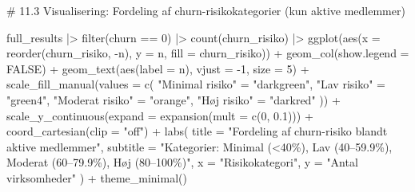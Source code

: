 \documentclass[
  11pt,
  letterpaper,
  DIV=11,
  numbers=noendperiod]{scrartcl}
\newenvironment{Shaded}{\begin{snugshade}}{\end{snugshade}}
\newcommand{\AttributeTok}[1]{\textcolor[rgb]{0.40,0.45,0.13}{#1}}
\newcommand{\CommentTok}[1]{\textcolor[rgb]{0.37,0.37,0.37}{#1}}
\newcommand{\ConstantTok}[1]{\textcolor[rgb]{0.56,0.35,0.01}{#1}}
\newcommand{\DecValTok}[1]{\textcolor[rgb]{0.68,0.00,0.00}{#1}}
\newcommand{\FloatTok}[1]{\textcolor[rgb]{0.68,0.00,0.00}{#1}}
\newcommand{\FunctionTok}[1]{\textcolor[rgb]{0.28,0.35,0.67}{#1}}
\newcommand{\NormalTok}[1]{\textcolor[rgb]{0.00,0.23,0.31}{#1}}
\newcommand{\OtherTok}[1]{\textcolor[rgb]{0.00,0.23,0.31}{#1}}
\newcommand{\SpecialCharTok}[1]{\textcolor[rgb]{0.37,0.37,0.37}{#1}}
\newcommand{\StringTok}[1]{\textcolor[rgb]{0.13,0.47,0.30}{#1}}
\begin{document}
\begin{Shaded}
\begin{Highlighting}[]
\CommentTok{\# 11.3 Visualisering: Fordeling af churn{-}risikokategorier (kun aktive medlemmer)}


\NormalTok{full\_results }\SpecialCharTok{|\textgreater{}} 
  \FunctionTok{filter}\NormalTok{(churn }\SpecialCharTok{==} \DecValTok{0}\NormalTok{) }\SpecialCharTok{|\textgreater{}}  
  \FunctionTok{count}\NormalTok{(churn\_risiko) }\SpecialCharTok{|\textgreater{}} 
  \FunctionTok{ggplot}\NormalTok{(}\FunctionTok{aes}\NormalTok{(}\AttributeTok{x =} \FunctionTok{reorder}\NormalTok{(churn\_risiko, }\SpecialCharTok{{-}}\NormalTok{n), }\AttributeTok{y =}\NormalTok{ n, }\AttributeTok{fill =}\NormalTok{ churn\_risiko)) }\SpecialCharTok{+}
  \FunctionTok{geom\_col}\NormalTok{(}\AttributeTok{show.legend =} \ConstantTok{FALSE}\NormalTok{) }\SpecialCharTok{+}
  \FunctionTok{geom\_text}\NormalTok{(}\FunctionTok{aes}\NormalTok{(}\AttributeTok{label =}\NormalTok{ n), }\AttributeTok{vjust =} \SpecialCharTok{{-}}\DecValTok{1}\NormalTok{, }\AttributeTok{size =} \DecValTok{5}\NormalTok{) }\SpecialCharTok{+}
  \FunctionTok{scale\_fill\_manual}\NormalTok{(}\AttributeTok{values =} \FunctionTok{c}\NormalTok{(}
    \StringTok{"Minimal risiko"} \OtherTok{=} \StringTok{"darkgreen"}\NormalTok{,}
    \StringTok{"Lav risiko"}     \OtherTok{=} \StringTok{"green4"}\NormalTok{,}
    \StringTok{"Moderat risiko"} \OtherTok{=} \StringTok{"orange"}\NormalTok{,}
    \StringTok{"Høj risiko"}     \OtherTok{=} \StringTok{"darkred"}
\NormalTok{  )) }\SpecialCharTok{+}
  \FunctionTok{scale\_y\_continuous}\NormalTok{(}\AttributeTok{expand =} \FunctionTok{expansion}\NormalTok{(}\AttributeTok{mult =} \FunctionTok{c}\NormalTok{(}\DecValTok{0}\NormalTok{, }\FloatTok{0.1}\NormalTok{))) }\SpecialCharTok{+}  
  \FunctionTok{coord\_cartesian}\NormalTok{(}\AttributeTok{clip =} \StringTok{"off"}\NormalTok{) }\SpecialCharTok{+}
  \FunctionTok{labs}\NormalTok{(}
    \AttributeTok{title =} \StringTok{"Fordeling af churn{-}risiko blandt aktive medlemmer"}\NormalTok{,}
    \AttributeTok{subtitle =} \StringTok{"Kategorier: Minimal (\textless{}40\%), Lav (40–59.9\%), Moderat (60–79.9\%), Høj (80–100\%)"}\NormalTok{,}
    \AttributeTok{x =} \StringTok{"Risikokategori"}\NormalTok{,}
    \AttributeTok{y =} \StringTok{"Antal virksomheder"}
\NormalTok{  ) }\SpecialCharTok{+}
  \FunctionTok{theme\_minimal}\NormalTok{()}
\end{Highlighting}
\end{Shaded}
\end{document}
